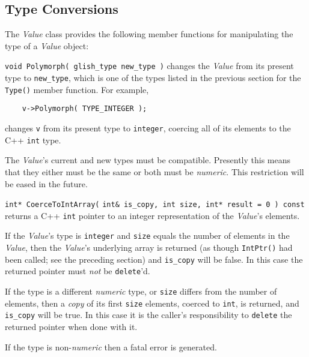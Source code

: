 \subsection{Type Conversions}
\label{conversion}

The {\em Value} class provides the following member functions for
manipulating the type of a {\em Value} object:
\begin{sloppy}
\begin{list}{}{}

\item[{\tt void Polymorph( glish\_type new\_type )}]
changes the {\em Value}
from its present type to {\tt new\_type}, which is one of the types
listed in the previous section for the {\tt Type()} member function.
For example,
\begin{verbatim}
    v->Polymorph( TYPE_INTEGER );
\end{verbatim}
changes {\tt v} from its present type to {\tt integer}, coercing
all of its elements to the C++ {\tt int} type.

The {\em Value\/}'s current and new types must be compatible.  Presently
this means that they either must be the same or both must be {\em numeric\/}.
This restriction will be eased in the future.

\item[{\tt int* CoerceToIntArray(}] {\tt int\& is\_copy, int size,
int* result = 0 ) const}
returns a C++ {\tt int} pointer to an integer
representation of the {\em Value\/}'s elements.

If the {\em Value\/}'s type is {\tt integer} and {\tt size} equals the
number of elements in the {\em Value\/}, then the {\em Value\/}'s
underlying array is returned (as though {\tt IntPtr()} had been called; see
the preceding section) and {\tt is\_copy} will be false.  In this
case the returned pointer must {\em not} be {\tt delete}'d.

If the type is a different {\em numeric} type, or {\tt size} differs from
the number of elements,
then a {\em copy} of its first {\tt size} elements,
coerced to {\tt int}, is returned, and {\tt is\_copy} will be true.
In this case it is the caller's responsibility to {\tt delete} the returned
pointer when done with it.

If the type is non-{\em numeric} then a fatal error is generated.


\end{list}
\end{sloppy}
